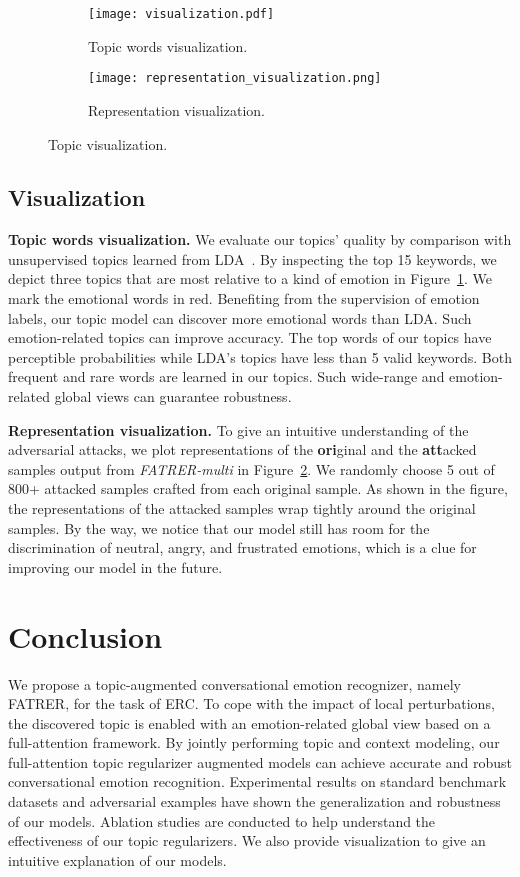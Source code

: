 \documentclass{ecai}
\begin{document}
\begin{figure}[ht]
\centering
\begin{subfigure}{0.48\textwidth}
    \texttt{[image: visualization.pdf]}
    \caption{Topic words visualization.}
    \label{fig:visualization1}
\end{subfigure}
\hfill
\begin{subfigure}{0.48\textwidth}
    \texttt{[image: representation\_visualization.png]}
    \caption{Representation visualization.}
    \label{fig:visualization2}
\end{subfigure}  
\caption{Topic visualization.}
\label{fig:visualization}
\end{figure}

\subsection{Visualization}
\textbf{Topic words visualization.} We evaluate our topics' quality by comparison with unsupervised topics learned from LDA~\cite{blei2003latent}. By inspecting the top 15 keywords, we depict three topics that are most relative to a kind of emotion in Figure~\ref{fig:visualization1}. We mark the emotional words in red. Benefiting from the supervision of emotion labels, our topic model can discover more emotional words than LDA. Such emotion-related topics can improve accuracy. The top words of our topics have perceptible probabilities while LDA's topics have less than 5 valid keywords. Both frequent and rare words are learned in our topics. Such wide-range and emotion-related global views can guarantee robustness.  

\noindent\textbf{Representation visualization.} To give an intuitive understanding of the adversarial attacks, we plot representations of the \textbf{ori}ginal and the \textbf{att}acked samples output from \textit{FATRER-multi} in Figure~\ref{fig:visualization2}. We randomly choose 5 out of 800+ attacked samples crafted from each original sample. As shown in the figure, the representations of the attacked samples wrap tightly around the original samples. By the way, we notice that our model still has room for the discrimination of neutral, angry, and frustrated emotions, which is a clue for improving our model in the future.

\section{Conclusion}
We propose a topic-augmented conversational emotion recognizer, namely FATRER, for the task of ERC. To cope with the impact of local perturbations, the discovered topic is enabled with an emotion-related global view based on a full-attention framework. By jointly performing topic and context modeling, our full-attention topic regularizer augmented models can achieve accurate
and robust conversational emotion recognition. Experimental results on standard benchmark datasets and adversarial examples have shown the generalization and robustness of our models. Ablation studies are conducted to help understand the effectiveness of our topic regularizers. We also provide visualization to give an intuitive explanation of our models.


\end{document}
